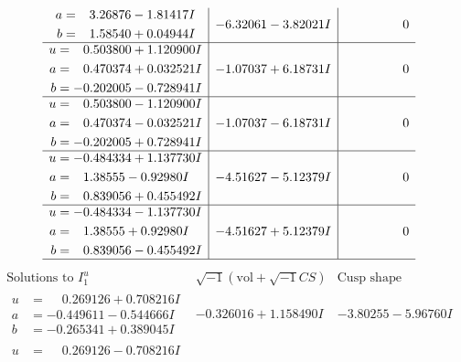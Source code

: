 \documentclass[1p]{elsarticle_modified}
\theoremstyle{definition}
\newcommand{\I}{\sqrt{-1}}
\begin{document}
$$\begin{array}{c|c|c}
\begin{aligned}
a &= \phantom{-}3.26876 - 1.81417 I \\
b &= \phantom{-}1.58540 + 0.04944 I\end{aligned}
 & -6.32061 - 3.82021 I & \phantom{-0.000000 } 0 \\ \hline\begin{aligned}
u &= \phantom{-}0.503800 + 1.120900 I \\
a &= \phantom{-}0.470374 + 0.032521 I \\
b &= -0.202005 - 0.728941 I\end{aligned}
 & -1.07037 + 6.18731 I & \phantom{-0.000000 } 0 \\ \hline\begin{aligned}
u &= \phantom{-}0.503800 - 1.120900 I \\
a &= \phantom{-}0.470374 - 0.032521 I \\
b &= -0.202005 + 0.728941 I\end{aligned}
 & -1.07037 - 6.18731 I & \phantom{-0.000000 } 0 \\ \hline\begin{aligned}
u &= -0.484334 + 1.137730 I \\
a &= \phantom{-}1.38555 - 0.92980 I \\
b &= \phantom{-}0.839056 + 0.455492 I\end{aligned}
 & -4.51627 - 5.12379 I & \phantom{-0.000000 } 0 \\ \hline\begin{aligned}
u &= -0.484334 - 1.137730 I \\
a &= \phantom{-}1.38555 + 0.92980 I \\
b &= \phantom{-}0.839056 - 0.455492 I\end{aligned}
 & -4.51627 + 5.12379 I & \phantom{-0.000000 } 0\\
 \hline 
 \end{array}$$\newpage$$\begin{array}{c|c|c}  
\text{Solutions to }I^u_{1}& \I (\text{vol} + \sqrt{-1}CS) & \text{Cusp shape}\\
 \hline 
\begin{aligned}
u &= \phantom{-}0.269126 + 0.708216 I \\
a &= -0.449611 - 0.544666 I \\
b &= -0.265341 + 0.389045 I\end{aligned}
 & -0.326016 + 1.158490 I & -3.80255 - 5.96760 I \\ \hline\begin{aligned}
u &= \phantom{-}0.269126 - 0.708216 I \\

\end{aligned}
\end{array}$$
\end{document}
